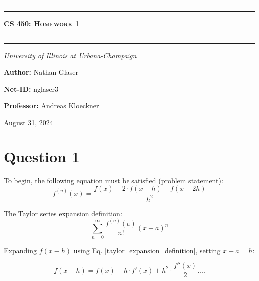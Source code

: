 \documentclass{article}
\begin{document}
\begin{titlepage}

\centering
\scshape
\vspace{\baselineskip}

%
\rule{\textwidth}{1.6pt}\vspace*{-\baselineskip}\vspace*{2pt}
\rule{\textwidth}{0.4pt}

{\Huge \textbf{\textsc{CS 450: Homework 1 \\
\vspace{15pt}}}}

\rule{\textwidth}{0.4pt}\vspace*{-\baselineskip}\vspace{3.2pt}
\rule{\textwidth}{1.6pt}\vspace{6pt}
\centerline{\textit{University of Illinois at Urbana-Champaign}} 
\vspace{1.5\baselineskip}


\large \centerline{\textbf{Author:} Nathan Glaser}
\large \centerline{\textbf{Net-ID:} nglaser3}
\quad

\large \centerline{\textbf{Professor:} Andreas Kloeckner}
\quad

\vfill
\large \centerline{August 31, 2024}
%
\end{titlepage}

\tableofcontents
\newpage
{}

\section{Question 1}
To begin, the following equation must be satisfied (problem statement):
\begin{equation}
    f^{(n)}(x) = \frac{f(x) -2 \cdot f(x-h) + f(x-2h)}{h^2}
    \label{abc}
\end{equation}

The Taylor series expansion definition:
\begin{equation}
    \label{taylor_expansion_definition}
    \sum_{n=0}^\infty \frac{f^{(n)}(a)}{n!}(x-a)^n
\end{equation}

Expanding $f(x-h)$ using Eq. \ref{taylor_expansion_definition}, setting $x-a = h$:

\begin{equation}
    \label{fx_h}
    f(x-h) = f(x) - h\cdot f'(x) + h^2 \cdot \frac{f''(x)}{2}  ....
\end{equation}
\end{document}
